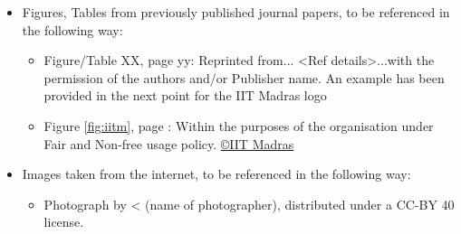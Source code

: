 \begin{itemize}
	\item Figures, Tables from previously published journal papers, to be referenced in the following way:
	\begin{itemize}
		\item Figure/Table XX, page yy: Reprinted from... <Ref details>...with the permission of the authors and/or Publisher name. An example has been provided in the next point for the IIT Madras logo
		\item Figure \ref{fig:iitm}, page \pageref{fig:iitm}: Within the purposes of the organisation under Fair and Non-free usage policy. \href{https://en.wikipedia.org/w/index.php?curid=26650718}{\copyright IIT Madras}
	\end{itemize}
	\item Images taken from the internet, to be referenced in the following way:
	\begin{itemize}
		\item Photograph by < (name of photographer), distributed under a CC-BY 40 license.
	\end{itemize}
\end{itemize}

\vspace*{0.1in}

